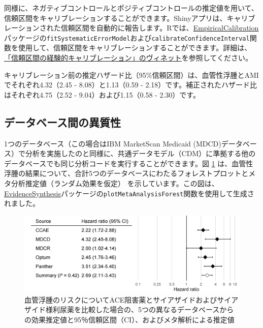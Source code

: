 \documentclass[
  11pt]{book}
\theoremstyle{definition}
\theoremstyle{definition}
\theoremstyle{definition}
\theoremstyle{definition}
\theoremstyle{remark}
\begin{document}
同様に、ネガティブコントロールとポジティブコントロールの推定値を用いて、信頼区間をキャリブレーションすることができます。Shinyアプリは、キャリブレーションされた信頼区間を自動的に報告します。Rでは、\href{https://ohdsi.github.io/EmpiricalCalibration/}{EmpiricalCalibration}パッケージの\texttt{fitSystematicErrorModel}および\texttt{calibrateConfidenceInterval}関数を使用して、信頼区間をキャリブレーションすることができます。詳細は、\href{https://ohdsi.github.io/EmpiricalCalibration/articles/EmpiricalCiCalibrationVignette.html}{「信頼区間の経験的キャリブレーション」のヴィネット}を参照してください。

キャリブレーション前の推定ハザード比（95\%信頼区間）は、血管性浮腫とAMIでそれぞれ4.32（2.45 - 8.08）と1.13（0.59 - 2.18）です。補正されたハザード比はそれぞれ4.75（2.52 - 9.04）および1.15（0.58 - 2.30）です。

\subsection{データベース間の異質性}\label{ux30c7ux30fcux30bfux30d9ux30fcux30b9ux9593ux306eux7570ux8ceaux6027}

1つのデータベース（この場合はIBM MarketScan Medicaid (MDCD)データベース）で分析を実施したのと同様に、共通データモデル（CDM）に準拠する他のデータベースでも同じ分析コードを実行することができます。図 \ref{fig:forest} は、血管性浮腫の結果について、合計5つのデータベースにわたるフォレストプロットとメタ分析推定値（ランダム効果を仮定） \citep{dersimonian_1986} を示しています。この図は、\href{https://ohdsi.github.io/EvidenceSynthesis/}{EvidenceSynthesis}パッケージの\texttt{plotMetaAnalysisForest}関数を使用して生成されました。

\begin{figure}

{\centering \includegraphics[width=0.9\linewidth]{images/MethodValidity/forest} 

}

\caption{血管浮腫のリスクについてACE阻害薬とサイアザイドおよびサイアザイド様利尿薬を比較した場合の、5つの異なるデータベースからの効果推定値と95％信頼区間（CI）、およびメタ解析による推定値}\label{fig:forest}
\end{figure}
\end{document}
